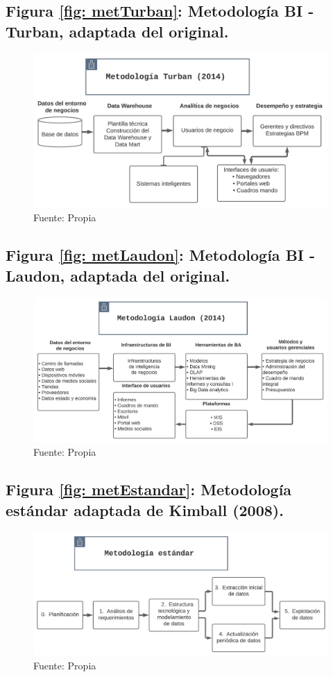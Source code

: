 \documentclass[12pt,jou]{apa7}
\begin{document}
\subsection{Figura \ref{fig: metTurban}: Metodología BI - Turban, adaptada del original.}
\begin{figure}[h] \label{Met_Turban}
\includegraphics[width=0.8\linewidth]{Figuras/Met_Turban}
\caption*{ Fuente: Propia}
\end{figure}

\subsection{Figura \ref{fig: metLaudon}: Metodología BI - Laudon, adaptada del original.}
\begin{figure}[h] \label{MetLaudon}
\includegraphics[width=1\linewidth]{Figuras/MetLaudon}
\caption*{Fuente: Propia}
\end{figure}

\subsection{Figura \ref{fig: metEstandar}: Metodología estándar adaptada de Kimball (2008).}
\begin{figure}[h]  \label{Met_estandar}
\centering
\includegraphics[width=1\linewidth]{Figuras/Met_estandar}
\caption*{ Fuente: Propia}
\end{figure}
\newpage
\end{document}
